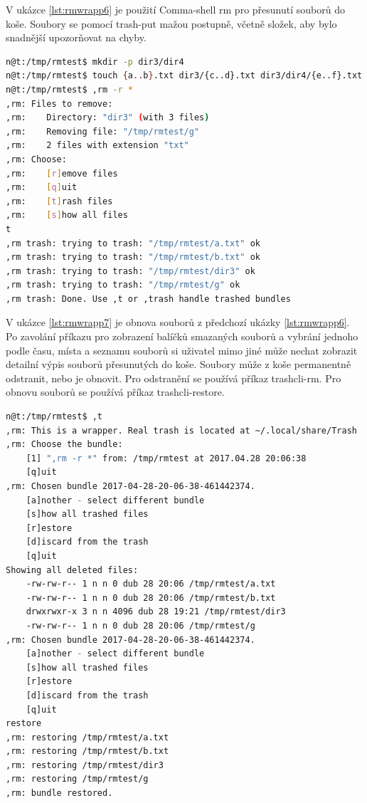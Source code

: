 \documentclass[thesis=M,czech]{FITthesis}[2012/06/26]
\begin{document}
V ukázce \ref{lst:rmwrapp6} je použití Comma-shell rm pro přesunutí souborů do koše. Soubory se pomocí trash-put mažou postupně, včetně složek, aby bylo snadnější upozorňovat na chyby.


\begin{minipage}{\linewidth}
\begin{lstlisting}[language=bash, caption={,rm - přesouvání do koše}, label={lst:rmwrapp6}]
n@t:/tmp/rmtest$ mkdir -p dir3/dir4
n@t:/tmp/rmtest$ touch {a..b}.txt dir3/{c..d}.txt dir3/dir4/{e..f}.txt g
n@t:/tmp/rmtest$ ,rm -r *
,rm: Files to remove:
,rm:    Directory: "dir3" (with 3 files)
,rm:    Removing file: "/tmp/rmtest/g"
,rm:    2 files with extension "txt"
,rm: Choose:
,rm:    [r]emove files
,rm:    [q]uit
,rm:    [t]rash files
,rm:    [s]how all files
t
,rm trash: trying to trash: "/tmp/rmtest/a.txt" ok
,rm trash: trying to trash: "/tmp/rmtest/b.txt" ok
,rm trash: trying to trash: "/tmp/rmtest/dir3" ok
,rm trash: trying to trash: "/tmp/rmtest/g" ok
,rm trash: Done. Use ,t or ,trash handle trashed bundles
\end{lstlisting}
\end{minipage}

V ukázce \ref{lst:rmwrapp7} je obnova souborů z předchozí ukázky \ref{lst:rmwrapp6}. Po zavolání příkazu pro zobrazení balíčků smazaných souborů a vybrání jednoho podle času, místa a seznamu souborů si uživatel mimo jiné může nechat zobrazit detailní výpis souborů přesunutých do koše. Soubory může z koše permanentně odstranit, nebo je obnovit. Pro odstranění se používá příkaz trashcli-rm. Pro obnovu souborů se používá příkaz trashcli-restore. 

\begin{minipage}{\linewidth}
\begin{lstlisting}[language=bash, caption={,rm - obnova souborů }, label={lst:rmwrapp7}]
n@t:/tmp/rmtest$ ,t
,rm: This is a wrapper. Real trash is located at ~/.local/share/Trash
,rm: Choose the bundle:
    [1] ",rm -r *" from: /tmp/rmtest at 2017.04.28 20:06:38
    [q]uit
,rm: Chosen bundle 2017-04-28-20-06-38-461442374.
    [a]nother - select different bundle
    [s]how all trashed files
    [r]estore
    [d]iscard from the trash
    [q]uit
Showing all deleted files:
    -rw-rw-r-- 1 n n 0 dub 28 20:06 /tmp/rmtest/a.txt
    -rw-rw-r-- 1 n n 0 dub 28 20:06 /tmp/rmtest/b.txt
    drwxrwxr-x 3 n n 4096 dub 28 19:21 /tmp/rmtest/dir3
    -rw-rw-r-- 1 n n 0 dub 28 20:06 /tmp/rmtest/g
,rm: Chosen bundle 2017-04-28-20-06-38-461442374.
    [a]nother - select different bundle
    [s]how all trashed files
    [r]estore
    [d]iscard from the trash
    [q]uit
restore
,rm: restoring /tmp/rmtest/a.txt
,rm: restoring /tmp/rmtest/b.txt
,rm: restoring /tmp/rmtest/dir3
,rm: restoring /tmp/rmtest/g
,rm: bundle restored.
\end{lstlisting}
\end{minipage}
\end{document}
